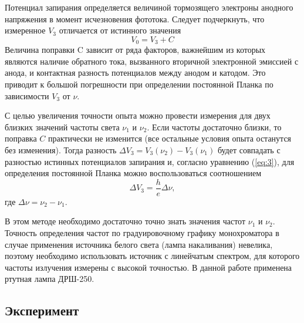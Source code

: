 Потенциал запирания определяется величиной тормозящего электроны анодного напряжения в момент исчезновения фототока. Следует подчеркнуть, что измеренное $V_{3}$ отличается от истинного значения
\begin{equation}
	V_0=V_{3}+C
\end{equation}
Величина поправки C зависит от ряда факторов, важнейшим из которых являются наличие обратного тока, вызванного вторичной электронной эмиссией с анода, и контактная разность потенциалов между анодом и катодом. Это приводит к большой погрешности 
при определении постоянной Планка по зависимости $V_{3}$ от $\nu$.

С целью увеличения точности опыта можно провести измерения для двух близких значений частоты света $\nu_1$ и $\nu_2$. Если частоты достаточно близки, то поправка $C$ практически не изменится (все остальные условия опыта останутся без изменения). Тогда разность $\Delta V_{3} = V_{3}(\nu_2)- V_{3}(\nu_1)$ будет совпадать с разностью истинных потенциалов запирания и, согласно уравнению (\ref{eq:3}), для определения постоянной Планка можно воспользоваться соотношением
\begin{equation}
	\Delta V_{3}=\frac he \Delta \nu,
\end{equation}
где $\Delta \nu= \nu_2- \nu_1$.

В этом методе необходимо достаточно точно знать значения частот $\nu_1$ и $\nu_2$. Точность определения частот по градуировочному графику монохроматора в случае применения источника белого света (лампа накаливания) невелика, поэтому необходимо использовать источник с линейчатым спектром, для которого частоты излучения измерены с высокой точностью. В данной работе применена ртутная лампа ДРШ-250. 

\subsection{Эксперимент}
